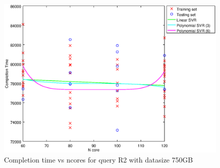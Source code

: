 
\begin {figure}[hbtp]
\centering
\includegraphics[width=\textwidth]{output/R2_750_ONLY_1_LINEAR_NCORE/plot_R2_750_bestmodels.eps}
\caption{Completion time vs ncores for query R2 with datasize 750GB}
\label{fig:only_1_linear_R2_750}
\end {figure}
